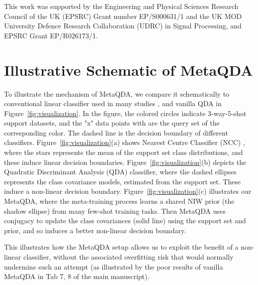 \documentclass[10pt,twocolumn,letterpaper]{article}
\begin{document}
 This work was supported by the Engineering and Physical Sciences Research Council of the UK (EPSRC) Grant number EP/S000631/1 and the UK MOD University Defence Research Collaboration (UDRC) in Signal Processing, and EPSRC Grant EP/R026173/1.


{\small


}




\appendix
\newpage

\section{Illustrative Schematic of MetaQDA}
To illustrate the mechanism of MetaQDA, we compare it schematically to conventional linear classifier used in many studies \cite{chen2019closerfewshot,snell2017prototypical,liu2020universal}, and vanilla QDA in Figure~\ref{fig:visualization}. In the figure, the colored circles indicate 3-way-5-shot support datasets, and the "x" data points with are the query set of the corresponding color. The dashed line is the decision boundary of different classifiers.
Figure~\ref{fig:visualization}(a) shows Nearest Centre Classifier (NCC) \cite{snell2017prototypical,liu2020universal}, where the stars represents the mean of the support set class distributions, and these induce linear decision boundaries. Figure~\ref{fig:visualization}(b) depicts the Quadratic Discriminant Analysis (QDA) classifier, where the dashed ellipses represents the class covariance models, estimated from the support set. These induce a non-linear decision boundary. Figure~\ref{fig:visualization}(c) illustrates our MetaQDA, where the meta-training process learns a shared NIW prior (the shadow ellipse) from many few-shot training tasks. Then MetaQDA uses conjugacy to update the class covariances (solid line) using the support set and prior, and so induces a better non-linear decision boundary. 

This illustrates how the MetaQDA setup allows us to exploit the benefit of a non-linear classifier, without the associated overfitting risk that would normally undermine such an attempt (as illustrated by the poor results of vanilla MetaQDA in Tab 7, 8 of the main manuscript).


\begin{figure*}[!h]
\centering
{}
\\


\caption{
\small \small
\textbf{Illustrative Schematic of MetaQDA.}
(a) NCC classifier uses the class mean to induce linear decision boundaries. (b) QDA uses both the support class mean and covariance to induce a curved decision boundary, but easily overfits in a few-shot regime due. (c) MetaQDA meta-learns the QDA parameter prior to provide stable estimation of a non-linear decision boundary without overfitting.}
\label{fig:visualization}
\vskip 0.5cm
\end{figure*}
\end{document}
